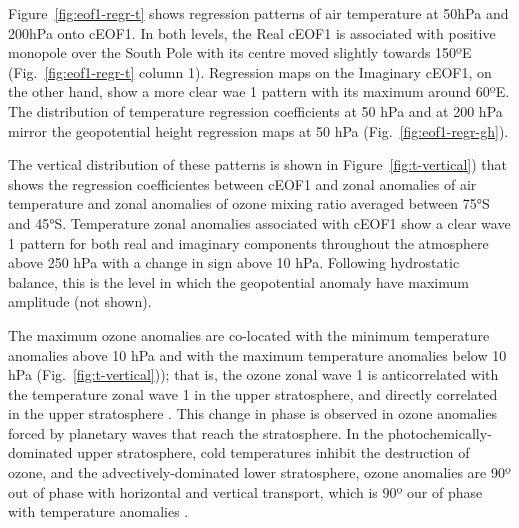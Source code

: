 \documentclass[smallextended]{svjour3}       %
\begin{document}
Figure~\ref{fig:eof1-regr-t} shows regression patterns of air temperature at 50hPa and 200hPa onto cEOF1. In both levels, the Real cEOF1 is associated with positive monopole over the South Pole with its centre moved slightly towards 150ºE (Fig.~\ref{fig:eof1-regr-t} column 1). Regression maps on the Imaginary cEOF1, on the other hand, show a more clear wae 1 pattern with its maximum around 60ºE. The distribution of temperature regression coefficients at 50 hPa and at 200 hPa mirror the geopotential height regression maps at 50 hPa (Fig.~\ref{fig:eof1-regr-gh}).

The vertical distribution of these patterns is shown in Figure~\ref{fig:t-vertical}) that shows the regression coefficientes between cEOF1 and zonal anomalies of air temperature and zonal anomalies of ozone mixing ratio averaged between 75°S and 45°S. Temperature zonal anomalies associated with cEOF1 show a clear wave 1 pattern for both real and imaginary components throughout the atmosphere above 250 hPa with a change in sign above 10 hPa. Following hydrostatic balance, this is the level in which the geopotential anomaly have maximum amplitude (not shown).

The maximum ozone anomalies are co-located with the minimum temperature anomalies above 10 hPa and with the maximum temperature anomalies below 10 hPa (Fig.~\ref{fig:t-vertical})); that is, the ozone zonal wave 1 is anticorrelated with the temperature zonal wave 1 in the upper stratosphere, and directly correlated in the upper stratosphere . This change in phase is observed in ozone anomalies forced by planetary waves that reach the stratosphere. In the photochemically-dominated upper stratosphere, cold temperatures inhibit the destruction of ozone, and the advectively-dominated lower stratosphere, ozone anomalies are 90º out of phase with horizontal and vertical transport, which is 90º our of phase with temperature anomalies \citep{hartmann1979, wirth1993, smith1995}.
\end{document}
